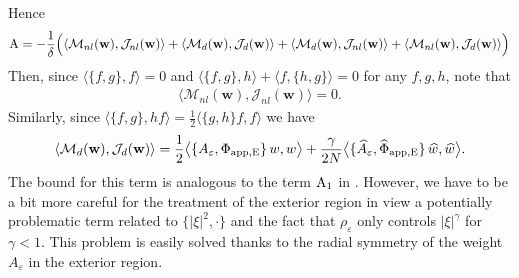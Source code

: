 \documentclass[11pt,reqno,a4paper]{amsart}
\def\eps{\varepsilon}
\newcommand{\cJ}{\mathcal{J}}
\newcommand{\cM}{\mathcal{M}}
\newcommand{\1}{\mathbbm{1}}
\theoremstyle{definition}
\theoremstyle{definition}
\numberwithin{equation}{section}
\begin{document}
Hence 
\begin{align}
    {\rm A}=-\frac{1}{\delta}\Big(\langle \cM_{nl}({\mathbf w}),\cJ_{nl}({\mathbf w})\rangle+\langle \cM_{d}({\mathbf w}),\cJ_{d}({\mathbf w})\rangle+\langle \cM_{d}({\mathbf w}),\cJ_{nl}({\mathbf w})\rangle+\langle \cM_{nl}({\mathbf w}),\cJ_{d}({\mathbf w})\rangle\Big)
\end{align}
Then, since $\langle \{f,g\},f\rangle=0$ and $\langle\{f,g\},h\rangle+\langle f,\{h,g\}\rangle=0$ for any $f,g,h$, note that 
\begin{align}
\label{bd:MnlJnl}
    \langle \cM_{nl}({\mathbf w}),\cJ_{nl}({\mathbf w})\rangle =0.
\end{align}
Similarly, since $\langle \{f,g\},hf\rangle=\frac12\langle \{g,h\}f,f\rangle$ we have 
\begin{align}
\label{def:MdJd}
\langle \cM_{d}({\mathbf w}),\cJ_{d}({\mathbf w})\rangle=\frac12\big\langle \{A_{\eps},\Phi_{\rm app,E}\}\,w,w\big\rangle +\frac{\gamma}{2N}\big\langle \{\widehat{A}_{\eps},\widehat{\Phi}_{\rm app,E}\}\,\widehat{w},\widehat{w}\big\rangle.
\end{align}
The bound for this term is analogous to the term ${\rm A}_1$ in \cite{dolce2024long}. However, we have to be a bit more careful for the treatment of the exterior region in view a potentially problematic term related to $\{|\xi|^2,\cdot\}$ and the fact that $\rho_\eps$ only controls $|\xi|^\gamma$ for $\gamma<1$. This problem is easily solved thanks to the radial symmetry of the weight $A_\eps$ in the exterior region.
\end{document}
